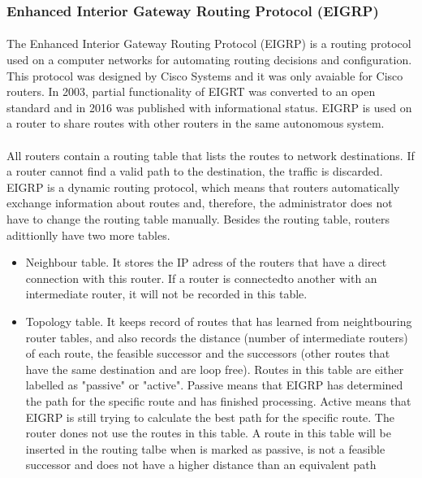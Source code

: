 \documentclass[12pt,a4paper]{report}
\begin{document}
\subsubsection{Enhanced Interior Gateway Routing Protocol (EIGRP)\cite{EIGRP}}
\paragraph{}The Enhanced Interior Gateway Routing Protocol (EIGRP) is a routing protocol used on a computer networks for automating routing decisions and configuration. This protocol was designed by Cisco Systems and it was only avaiable for Cisco routers. In 2003, partial functionality of EIGRT was converted to an open standard and in 2016 was published with informational status. EIGRP is used on a router to share routes with other routers in the same autonomous system.
\paragraph{}All routers contain a routing table that lists the routes to network destinations. If a router cannot find a valid path to the destination, the traffic is discarded. EIGRP is a dynamic routing protocol, which means that routers automatically exchange information about routes and, therefore, the administrator does not have to change the routing table manually. Besides the routing table, routers adittionlly have two more tables.
\begin{itemize}
\item Neighbour table. It stores the IP adress of the routers that have a direct connection with this router. If a router is connectedto another with an intermediate router, it will not be recorded in this table.
\item Topology table. It keeps record of routes that has learned from neightbouring router tables, and also records the distance (number of intermediate routers) of each route, the feasible successor and the successors (other routes that have the same destination and are loop free). Routes in this table are either labelled as "passive" or "active". Passive means that EIGRP  has determined the path for the specific route and has finished processing. Active means that EIGRP is still trying to calculate the best path for the specific route. The router dones not use the routes in this table. A route in this table will be inserted in the routing talbe when is marked as passive, is not a feasible successor and does not have a higher distance than an equivalent path
\end{itemize}
\end{document}

